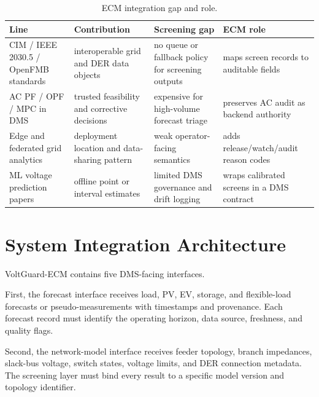 \documentclass[
  preprint,12pt]{elsarticle}
\begin{document}
\begin{longtable}[]{@{}
  >{\centering\hyphenpenalty=10000\exhyphenpenalty=10000\arraybackslash}m{}
  >{\centering\hyphenpenalty=10000\exhyphenpenalty=10000\arraybackslash}m{}
  >{\centering\hyphenpenalty=10000\exhyphenpenalty=10000\arraybackslash}m{}
  >{\centering\hyphenpenalty=10000\exhyphenpenalty=10000\arraybackslash}m{}@{}}
\caption{ECM integration gap and role.}\\\toprule\noalign{}
Line & Contribution & Screening gap & ECM role \\
\midrule\noalign{}
\endhead
\bottomrule\noalign{}
\endlastfoot
CIM / IEEE 2030.5 / OpenFMB standards & interoperable grid and DER data
objects & no queue or fallback policy for screening outputs & maps
screen records to auditable fields \\
AC PF / OPF / MPC in DMS & trusted feasibility and corrective decisions
& expensive for high-volume forecast triage & preserves AC audit as
backend authority \\
Edge and federated grid analytics & deployment location and data-sharing
pattern & weak operator-facing semantics & adds release/watch/audit
reason codes \\
ML voltage prediction papers & offline point or interval estimates &
limited DMS governance and drift logging & wraps calibrated screens in a
DMS contract \\
\end{longtable}

\section{System Integration
Architecture}\label{system-integration-architecture}

VoltGuard-ECM contains five DMS-facing interfaces.

First, the forecast interface receives load, PV, EV, storage, and
flexible-load forecasts or pseudo-measurements with timestamps and
provenance. Each forecast record must identify the operating horizon,
data source, freshness, and quality flags.

Second, the network-model interface receives feeder topology, branch
impedances, slack-bus voltage, switch states, voltage limits, and DER
connection metadata. The screening layer must bind every result to a
specific model version and topology identifier.
\end{document}

